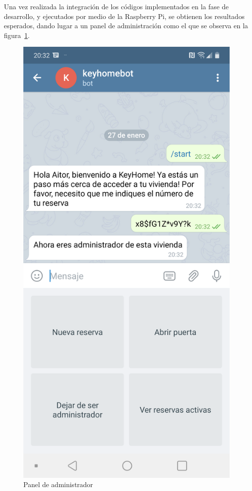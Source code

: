 Una vez realizada la integración de los códigos implementados en la fase de desarrollo, y ejecutados por medio de la Raspberry Pi, se obtienen los resultados esperados, dando lugar a un panel de administración como el que se observa en la figura~\ref{fig:panel-de-administrador}.
\begin{figure}[tbp]
\centering
\includegraphics[scale = 0.15]{fig/Panel_de_administrador.png}
\caption{Panel de administrador}
\label{fig:panel-de-administrador}
\end{figure}

